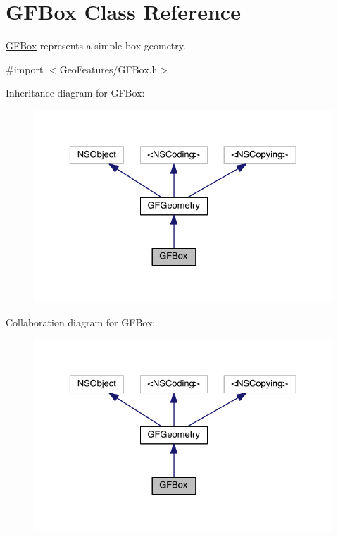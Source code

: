 \hypertarget{interface_g_f_box}{}\section{G\+F\+Box Class Reference}
\label{interface_g_f_box}


\hyperlink{interface_g_f_box}{G\+F\+Box} represents a simple box geometry.  




{\ttfamily \#import $<$Geo\+Features/\+G\+F\+Box.\+h$>$}



Inheritance diagram for G\+F\+Box\+:\nopagebreak
\begin{figure}[H]
\begin{center}
\leavevmode
\includegraphics[width=329pt]{interface_g_f_box__inherit__graph}
\end{center}
\end{figure}


Collaboration diagram for G\+F\+Box\+:\nopagebreak
\begin{figure}[H]
\begin{center}
\leavevmode
\includegraphics[width=329pt]{interface_g_f_box__coll__graph}
\end{center}
\end{figure}
